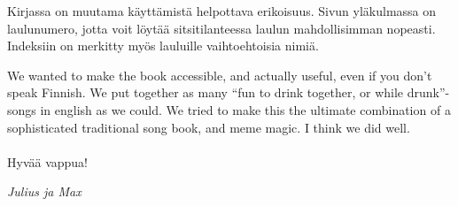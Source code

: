 Kirjassa on muutama käyttämistä helpottava erikoisuus. Sivun yläkulmassa on laulunumero, jotta
voit löytää sitsitilanteessa laulun mahdollisimman nopeasti. Indeksiin on merkitty myös lau\-luil\-le vaihtoehtoisia nimiä.

We wanted to make the book accessible, and actually useful, even if you don’t
speak Finnish. We put together as many “fun to drink together, or while drunk”-songs
in english as we could. We tried to make this the ultimate combination of a
sophisticated traditional song book, and meme magic. I think we did well.
\\
\\
Hyvää vappua!

\vfill
\textit{Julius ja Max}

\newpage
\blankpage
